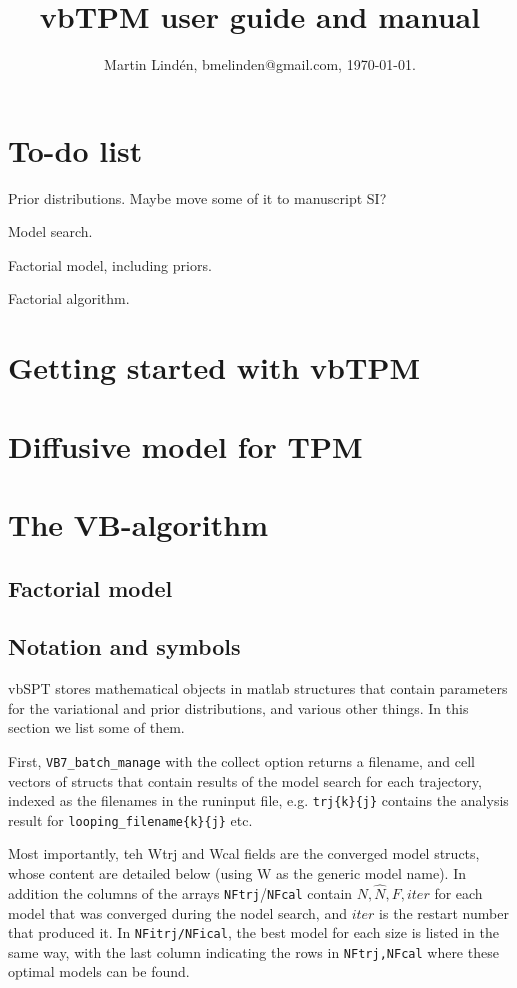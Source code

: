 \documentclass[11pt,letterpaper,twocolumn]{article}
\title{vbTPM user guide and manual}
\author{Martin Lind\'en, bmelinden@gmail.com, \today.}
\date{}
\begin{document}
\maketitle
\tableofcontents
\section*{To-do list}
Prior distributions. Maybe move some of it to manuscript SI?

Model search.

Factorial model, including priors.

Factorial algorithm.



\section{Getting started with vbTPM}

\section{Diffusive model for TPM}

\section{The VB-algorithm}

\subsection{Factorial model}
\subsection{Notation and symbols}\label{sec:notation}
vbSPT stores mathematical objects in matlab structures that contain
parameters for the variational and prior distributions, and various
other things. In this section we list some of them.

First, \verb+VB7_batch_manage+ with the collect option returns a
filename, and cell vectors of structs that contain results of the
model search for each trajectory, indexed as the filenames in the
runinput file, e.g. \verb+trj{k}{j}+ contains the analysis result for
\verb+looping_filename{k}{j}+ etc. 

Most importantly, teh Wtrj and Wcal fields are the converged model
structs, whose content are detailed below (using W as the generic
model name). In addition the columns of the arrays
\verb+NFtrj+/\verb+NFcal+ contain $N,\hat N, F, iter$ for each model
that was converged during the nodel search, and $iter$ is the restart
number that produced it. In \verb+NFitrj/NFical+, the best model for
each size is listed in the same way, with the last column indicating
the rows in \verb+NFtrj,NFcal+ where these optimal models can be
found. 
\end{document}

